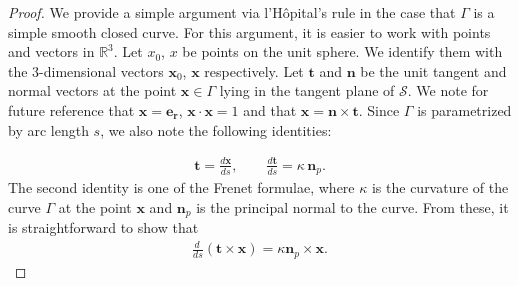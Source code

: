\documentclass[final]{siamltex}
\begin{document}
\begin{proof}

We provide a simple argument via l'H\^{o}pital's rule in the case that
$\Gamma$ is a simple smooth closed curve. For this argument, it is
easier  to work with points and vectors in $\mathbb{R}^3$.  Let $x_0$,
$x$ be points on the unit sphere. We identify them with the
3-dimensional vectors $\mathbf{x}_{0}$, $\mathbf{x}$ respectively.  Let
$\mathbf{t}$ and $\mathbf{n}$ be the unit tangent and normal vectors
at the point $\mathbf{x} \in \Gamma$ lying in the tangent plane of
$\mathcal{S}$.  We note for future reference that
$\mathbf{x}=\mathbf{e_r}$, $\mathbf{x} \cdot \mathbf{x} = 1$ and that
$\mathbf{x} = \mathbf{n} \times \mathbf{t}$. Since $\Gamma$ is
parametrized by arc length $s$, we also note the following identities:

\begin{align*}
  \mathbf{t} = \frac{d\mathbf{x}}{ds}, \qquad 
  \frac{d\mathbf{t}}{ds} = \kappa \, \mathbf{n}_{p}.
\end{align*}
The second identity is one of the Frenet formulae, where $\kappa$ is
the curvature of the curve $\Gamma$ at the point $\mathbf{x}$ and
$\mathbf{n}_{p}$ is the principal normal to the curve.  From these, it
is straightforward to show that 
\begin{align*}
  \frac{d \, }{ds} \left( \mathbf{t} \times \mathbf{x} \right)=
  \kappa \mathbf{n}_{p} \times \mathbf{x} . 
\end{align*}


\end{proof}
\end{document}
